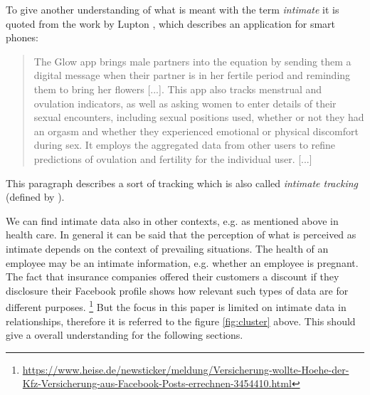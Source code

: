 To give another understanding of what is meant with the term \textit{intimate} it is quoted from the work by Lupton \cite{doi:10.1080/13691058.2014.920528}, which describes an application for smart phones:
\begin{quote}
	The	Glow app brings male partners into the equation by sending them a digital
	message when their partner is in her fertile period and reminding them to bring her flowers	[...]. This app also tracks menstrual and ovulation indicators, as well as asking women to enter details of their sexual encounters, including sexual positions used, whether or not they had an orgasm and whether they experienced emotional or physical discomfort during sex. It employs the aggregated data from other users to refine predictions of ovulation and fertility for the individual user. [...]
\end{quote}
This paragraph describes a sort of tracking which is also called \textit{intimate tracking} (defined by \cite{doi:10.1080/15265161.2017.1409823}).

We can find intimate data also in other contexts, e.g. as mentioned above in health care.
In general it can be said that the perception of what is perceived as intimate depends on the context of prevailing situations. The health of an employee may be an intimate information, e.g. whether an employee is pregnant. The fact that insurance companies offered their customers a discount if they disclosure their Facebook profile shows how relevant such types of data are for different purposes. \footnote{\url{https://www.heise.de/newsticker/meldung/Versicherung-wollte-Hoehe-der-Kfz-Versicherung-aus-Facebook-Posts-errechnen-3454410.html}}
But the focus in this paper is limited on intimate data in relationships, therefore it is referred to the figure \ref{fig:cluster} above. This should give a overall understanding for the following sections. 
